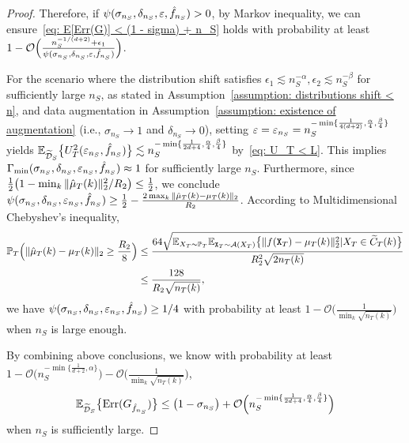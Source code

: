 \begin{proof}
    Therefore, if $\psi(\sigma_{n_S}, \delta_{n_S}, \varepsilon, \hat{f}_{n_S}) > 0$, by Markov inequality, we can ensure~\eqref{eq: E[Err(G)] < (1 - sigma) + n_S} holds with probability at least $1 - \mathcal{O}\Big(\frac{n_S^{-1/(d+2)} + \epsilon_1}{\psi(\sigma_{n_S}, \delta_{n_S}, \varepsilon, \hat{f}_{n_S})}\Big)$.
    
    For the scenario where the distribution shift satisfies $\epsilon_1 \lesssim n_S^{-\alpha}, \epsilon_2 \lesssim n_S^{-\beta}$ for sufficiently large $n_S$, as stated in Assumption~\ref{assumption: distributions shift < n}, and data augmentation in Assumption~\ref{assumption: existence of augmentation} (i.e., $\sigma_{n_S} \to 1$ and $\delta_{n_S} \to 0$), setting $\varepsilon = \varepsilon_{n_S} = n_S^{-\min\{\frac{1}{4(d + 2)},\frac{\alpha}{4}, \frac{\beta}{4}\}}$ yields $\mathbb{E}_{\widetilde{\mathcal{D}}_S}\big\{U_T^2(\varepsilon_{n_S}, \hat{f}_{n_S})\big\} \lesssim n_S^{-\min\{\frac{1}{2d+4}, \frac{\alpha}{4}, \frac{\beta}{4}\}}$ by~\eqref{eq: U_T < L}. This implies $\Gamma_{\min}(\sigma_{n_S}, \delta_{n_S}, \varepsilon_{n_S}, \hat{f}_{n_S}) \approx 1$ for sufficiently large $n_S$.  Furthermore, since $\frac{1}{2}\big(1 - \min_k\Vert{\hat{\mu}_T(k)}\Vert_2^2/R_2\big) \leq \frac{1}{2}$, we conclude $\psi(\sigma_{n_S}, \delta_{n_S}, \varepsilon_{n_S}, \hat{f}_{n_S}) \geq \frac{1}{2} - \frac{2\max_{k}\Vert{\hat{\mu}_T(k) - \mu_T(k)}\Vert_2}{R_2}$. According to Multidimensional Chebyshev's inequality,
    \begin{align*}
        \mathbb{P}_T\Big(\Vert{\hat{\mu}_T(k) - \mu_T(k)}\Vert_2 \geq \frac{R_2}{8}\Big) &\leq \frac{64\sqrt{\mathbb{E}_{X_T\sim\mathbb{P}_T}\mathbb{E}_{\mathtt{X}_T \sim \mathcal{A}(X_T)}\big\{\Vert{f(\mathtt{X}_T) - \mu_T(k)}\Vert_2^2\vert X_T\in \widetilde{C}_T(k)\big\}}}{R_2^2\sqrt{2n_T(k)}} \\
        &\leq \frac{128}{R_2\sqrt{n_T(k)}},
    \end{align*}
    we have $\psi(\sigma_{n_S}, \delta_{n_S}, \varepsilon_{n_S}, \hat{f}_{n_S}) \geq 1/4$ with probability at least $1 - \mathcal{O}\big(\frac{1}{\min_{k}\sqrt{n_T(k)}}\big)$ when $n_S$ is large enough.

    By combining above conclusions, we know with probability at least $1 - \mathcal{O}\big(n_S^{-\min\{\frac{1}{d+2}, \alpha\}}\big) - \mathcal{O}\big(\frac{1}{\min_{k}\sqrt{n_T(k)}}\big)$,
    \begin{align*}
        \mathbb{E}_{\widetilde{\mathcal{D}}_S}\big\{\mathrm{Err}(G_{\hat{f}_{n_S}})\big\} \leq \big(1 - \sigma_{n_S}\big) + \mathcal{O}\Big(n_S^{-\min\{\frac{1}{2d+4}, \frac{\alpha}{4}, \frac{\beta}{4}\}}\Big)
    \end{align*}
    when $n_S$ is sufficiently large.
\end{proof} 